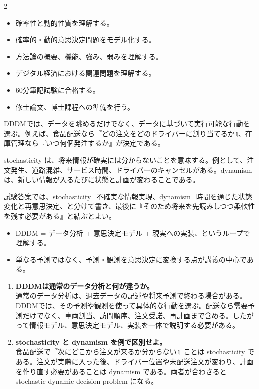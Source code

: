 \clearpage
{}
\begin{multicols}{2}\footnotesize\raggedcolumns
{}
\begin{itemize}
\item 確率性と動的性質を理解する。
\item 確率的・動的意思決定問題をモデル化する。
\item 方法論の概要、機能、強み、弱みを理解する。
\item デジタル経済における関連問題を理解する。
\item 60分筆記試験に合格する。
\item 修士論文、博士課程への準備を行う。
\end{itemize}
DDDMでは、データを眺めるだけでなく、データに基づいて実行可能な行動を選ぶ。例えば、食品配送なら『どの注文をどのドライバーに割り当てるか』、在庫管理なら『いつ何個発注するか』が決定である。\par

stochasticity は、将来情報が確実には分からないことを意味する。例として、注文発生、道路混雑、サービス時間、ドライバーのキャンセルがある。dynamism は、新しい情報が入るたびに状態と計画が変わることである。\par

試験答案では、stochasticity=不確実な情報実現、dynamism=時間を通じた状態変化と再意思決定、と分けて書き、最後に『そのため将来を先読みしつつ柔軟性を残す必要がある』と結ぶとよい。\par
{}
\begin{itemize}
\item DDDM = データ分析 + 意思決定モデル + 現実への実装、というループで理解する。
\item 単なる予測ではなく、予測・観測を意思決定に変換する点が講義の中心である。
\end{itemize}
\begin{enumerate}
\item \textbf{DDDMは通常のデータ分析と何が違うか。}\\通常のデータ分析は、過去データの記述や将来予測で終わる場合がある。DDDMでは、その予測や観測を使って具体的な行動を選ぶ。配送なら需要予測だけでなく、車両割当、訪問順序、注文受諾、再計画まで含める。したがって情報モデル、意思決定モデル、実装を一体で説明する必要がある。
\item \textbf{stochasticity と dynamism を例で区別せよ。}\\食品配送で『次にどこから注文が来るか分からない』ことは stochasticity である。注文が実際に入った後、ドライバー位置や未配送注文が変わり、計画を作り直す必要があることは dynamism である。両者が合わさると stochastic dynamic decision problem になる。
\end{enumerate}
\end{multicols}

